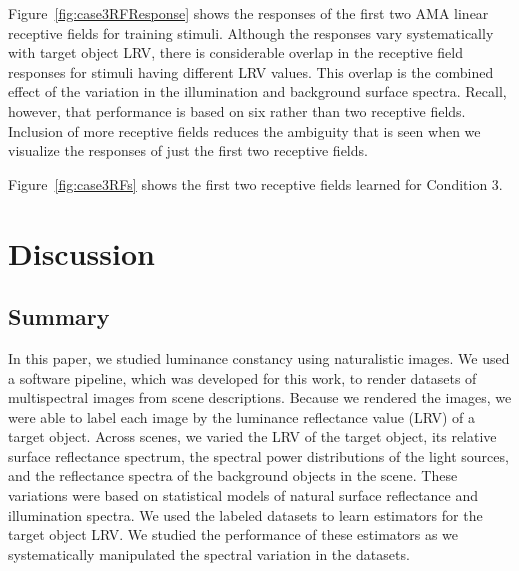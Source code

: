 \documentclass{jov}
\begin{document}
Figure~\ref{fig:case3RFResponse} shows the responses of the first two AMA linear receptive fields for training stimuli.
Although the responses vary systematically with target object LRV, there is considerable overlap in the receptive field responses for stimuli having different LRV values.
This overlap is the combined effect of the variation in the illumination and background surface spectra.
Recall, however, that performance is based on six rather than two receptive fields.
Inclusion of more receptive fields reduces the ambiguity that is seen when we visualize the responses of just the first two receptive fields.

Figure~\ref{fig:case3RFs} shows the first two receptive fields learned for Condition 3.


\section{Discussion} \label{Discussion}

\subsection{Summary}

In this paper, we studied luminance constancy using naturalistic images.
We used a software pipeline, which was developed for this work, to render datasets of multispectral images from scene descriptions.
Because we rendered the images, we were able to label each image by the luminance reflectance value (LRV) of a target object.
Across scenes, we varied the LRV of the target object, its relative surface reflectance spectrum, 
the spectral power distributions of the light sources, and the reflectance spectra of the background objects in the scene.
These variations were based on statistical models of natural surface reflectance and illumination spectra.
We used the labeled datasets to learn estimators for the target object LRV.
We studied the performance of these estimators as we systematically manipulated the 
spectral variation in the datasets.
\end{document}
